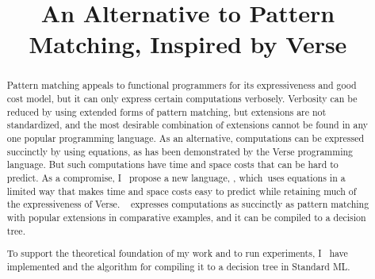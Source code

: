 \documentclass[manuscript,screen,review, 12pt, nonacm]{acmart}
\title{An Alternative to Pattern Matching, Inspired by Verse}
\begin{document}
\begin{abstract}
    Pattern matching %
    appeals %
    to functional programmers for its expressiveness and good cost model, 
    but     
    it %
    can only express %
    certain computations verbosely. 
    Verbosity %
    can be reduced %
    by using extended forms of pattern matching,
    but extensions %
    are %
    not standardized, and
    the most desirable combination of extensions cannot be found in 
    any one popular programming language. As an alternative, 
    computations can be expressed succinctly by 
    using equations, as has been demonstrated by the Verse programming language. 
    But such computations have time and space costs that can be hard to predict. 
    As a compromise, 
    I %
    ~propose %
     a 
    new language, \VMinus, %
    which~uses equations in a limited way that makes time and space costs easy
    to predict while retaining much of the expressiveness of Verse. 
    \VMinus~ %
    expresses %
    computations as succinctly as pattern matching with popular extensions in
    comparative examples, and 
    it %
    can be compiled %
    to a decision tree. 
    
    To support the theoretical foundation of my work and to run experiments, 
    I %
    ~have %
    implemented \VMinus and the algorithm for compiling it to a decision tree in
    Standard ML.
\end{abstract}

\maketitle
\end{document}
